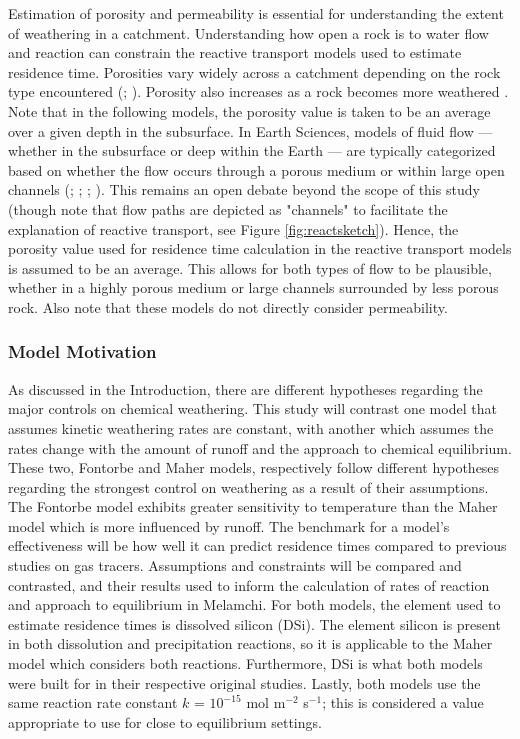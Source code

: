 Estimation of porosity and permeability is essential for understanding the extent of weathering in a catchment. Understanding how open a rock is to water flow and reaction can constrain the reactive transport models used to estimate residence time. Porosities vary widely across a catchment depending on the rock type encountered (\cite{singhWeatheringPotentialIndex1987}; \cite{davidLaboratoryMeasurementCompactioninduced1994}). Porosity also increases as a rock becomes more weathered \parencite{marquesWeatheringZonesMetamorphic2010}. Note that in the following models, the porosity value is taken to be an average over a given depth in the subsurface. In Earth Sciences, models of fluid flow — whether in the subsurface or deep within the Earth — are typically categorized based on whether the flow occurs through a porous medium or within large open channels (\cite{pedrazasRelationshipTopographyBedrock2021}; \cite{maherRoleFluidResidence2011}; \cite{kelemenExtractionMidOceanRidge1995}; \cite{jacksonChemicalDifferentiationCold2018}). This remains an open debate beyond the scope of this study (though note that flow paths are depicted as "channels" to facilitate the explanation of reactive transport, see Figure \ref{fig:reactsketch}). Hence, the porosity value used for residence time calculation in the reactive transport models is assumed to be an average. This allows for both types of flow to be plausible, whether in a highly porous medium or large channels surrounded by less porous rock. Also note that these models do not directly consider permeability.

\subsubsection*{Model Motivation}

As discussed in the Introduction, there are different hypotheses regarding the major controls on chemical weathering. This study will contrast one model that assumes kinetic weathering rates are constant, with another which assumes the rates change with the amount of runoff and the approach to chemical equilibrium. These two, Fontorbe and Maher models, respectively follow different hypotheses regarding the strongest control on weathering as a result of their assumptions. The Fontorbe model exhibits greater sensitivity to temperature than the Maher model which is more influenced by runoff. The benchmark for a model's effectiveness will be how well it can predict residence times compared to previous studies on gas tracers. Assumptions and constraints will be compared and contrasted, and their results used to inform the calculation of rates of reaction and approach to equilibrium in Melamchi. For both models, the element used to estimate residence times is dissolved silicon (DSi). The element silicon is present in both dissolution and precipitation reactions, so it is applicable to the Maher model which considers both reactions. Furthermore, DSi is what both models were built for in their respective original studies. Lastly, both models use the same reaction rate constant $k$ = $10^{-15}$ mol m$^{-2}$ s$^{-1}$; this is considered a value appropriate to use for close to equilibrium settings.


